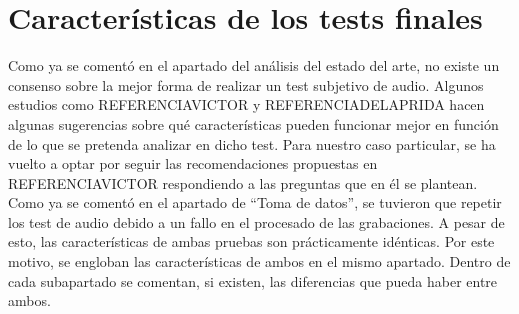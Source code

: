 \documentclass[11pt,a4paper,twoside]{book}
\begin{document}
        \section{Características de los tests finales}
            Como ya se comentó en el apartado del análisis del estado del arte, no existe un consenso sobre la mejor forma de realizar un test subjetivo de audio. Algunos estudios como REFERENCIAVICTOR y REFERENCIADELAPRIDA hacen algunas sugerencias sobre qué características pueden funcionar mejor en función de lo que se pretenda analizar en dicho test. Para nuestro caso particular, se ha vuelto a optar por seguir las recomendaciones propuestas en REFERENCIAVICTOR respondiendo a las preguntas que en él se plantean. Como ya se comentó en el apartado de ``Toma de datos'', se tuvieron que repetir los test de audio debido a un fallo en el procesado de las grabaciones. A pesar de esto, las características de ambas pruebas son prácticamente idénticas. Por este motivo, se engloban las características de ambos en el mismo apartado. Dentro de cada subapartado se comentan, si existen, las diferencias que pueda haber entre ambos.
            
\end{document}
